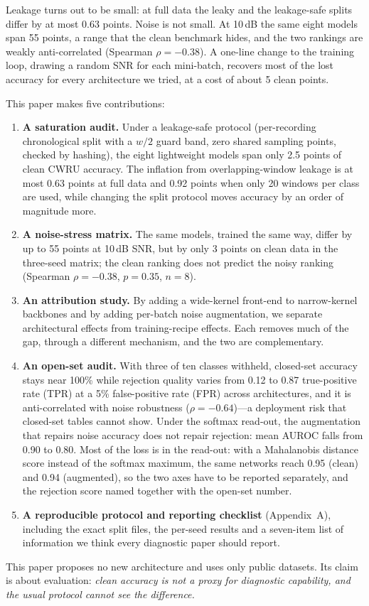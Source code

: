 \documentclass[11pt,a4paper]{article}
\begin{document}
Leakage turns out to be small: at full data the leaky and the leakage-safe splits differ by at most 0.63 points. Noise is not small. At 10\,dB the same eight models span 55 points, a range that the clean benchmark hides, and the two rankings are weakly anti-correlated (Spearman $\rho=-0.38$). A one-line change to the training loop, drawing a random SNR for each mini-batch, recovers most of the lost accuracy for every architecture we tried, at a cost of about 5 clean points.

This paper makes five contributions:
\begin{enumerate}
\item \textbf{A saturation audit.} Under a leakage-safe protocol (per-recording chronological split with a $w/2$ guard band, zero shared sampling points, checked by hashing), the eight lightweight models span only 2.5 points of clean CWRU accuracy. The inflation from overlapping-window leakage is at most 0.63 points at full data and 0.92 points when only 20 windows per class are used, while changing the split protocol moves accuracy by an order of magnitude more.
\item \textbf{A noise-stress matrix.} The same models, trained the same way, differ by up to 55 points at 10\,dB SNR, but by only 3 points on clean data in the three-seed matrix; the clean ranking does not predict the noisy ranking (Spearman $\rho=-0.38$, $p=0.35$, $n=8$).
\item \textbf{An attribution study.} By adding a wide-kernel front-end to narrow-kernel backbones and by adding per-batch noise augmentation, we separate architectural effects from training-recipe effects. Each removes much of the gap, through a different mechanism, and the two are complementary.
\item \textbf{An open-set audit.} With three of ten classes withheld, closed-set accuracy stays near 100\% while rejection quality varies from 0.12 to 0.87 true-positive rate (TPR) at a 5\% false-positive rate (FPR) across architectures, and it is anti-correlated with noise robustness ($\rho=-0.64$)---a deployment risk that closed-set tables cannot show. Under the softmax read-out, the augmentation that repairs noise accuracy does not repair rejection: mean AUROC falls from 0.90 to 0.80. Most of the loss is in the read-out: with a Mahalanobis distance score instead of the softmax maximum, the same networks reach 0.95 (clean) and 0.94 (augmented), so the two axes have to be reported separately, and the rejection score named together with the open-set number.
\item \textbf{A reproducible protocol and reporting checklist} (Appendix~A), including the exact split files, the per-seed results and a seven-item list of information we think every diagnostic paper should report.
\end{enumerate}
This paper proposes no new architecture and uses only public datasets. Its claim is about evaluation: \emph{clean accuracy is not a proxy for diagnostic capability, and the usual protocol cannot see the difference.}
\end{document}
